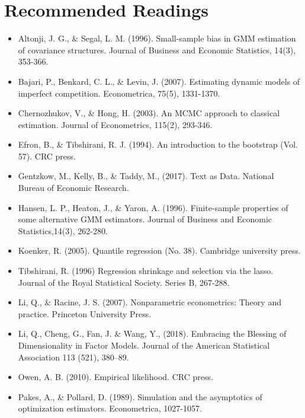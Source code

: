 \documentclass[11pt]{article}
\begin{document}
\section{Recommended Readings}
\begin{itemize}
\item Altonji, J. G., \& Segal, L. M. (1996). Small-sample bias in GMM estimation of covariance structures. Journal of Business and Economic Statistics, 14(3), 353-366. 
\item Bajari, P., Benkard, C. L., \& Levin, J. (2007). Estimating dynamic models of imperfect competition. Econometrica, 75(5), 1331-1370. 
\item Chernozhukov, V., \& Hong, H. (2003). An MCMC approach to classical estimation. Journal of Econometrics, 115(2), 293-346. 
\item Efron, B., \& Tibshirani, R. J. (1994). An introduction to the bootstrap (Vol. 57). CRC press. 
\item Gentzkow, M., Kelly, B., \& Taddy, M., (2017). Text as Data. National Bureau of
Economic Research.
\item Hansen, L. P., Heaton, J., \& Yaron, A. (1996). Finite-sample properties of some alternative GMM estimators. Journal of Business and Economic Statistics,14(3), 262-280. 
\item Koenker, R. (2005). Quantile regression (No. 38). Cambridge university press. 
\item Tibshirani, R. (1996) Regression shrinkage and selection via the lasso. Journal of the Royal Statistical Society. Series B, 267-288. 
\item Li, Q., \& Racine, J. S. (2007). Nonparametric econometrics: Theory and practice. Princeton University Press. 
\item Li, Q., Cheng, G., Fan, J. \& Wang, Y., (2018). Embracing the Blessing of Dimensionality in Factor Models. Journal of the American Statistical Association 113 (521), 380–89.
\item Owen, A. B. (2010). Empirical likelihood. CRC press. 
\item Pakes, A., \& Pollard, D. (1989). Simulation and the asymptotics of optimization estimators. Econometrica, 1027-1057. 

\end{itemize}
\end{document}
